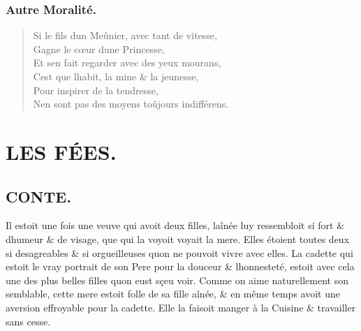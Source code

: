 \documentclass[14pt,a4paper]{memoir}
\newcommand{\notechapter}[1]{%
  \addtonotes{\protect\section*{#1}}%
}
\newcommand{\notesection}[1]{%
  \addtonotes{\protect\par\protect\vspace{2ex}\protect\noindent\textbf{#1}\protect\par\protect\vspace{1ex}}%
}
\begin{document}
{{\begin{otherlanguage}{french}
\begin{verse}
\end{verse}

\subsection{Autre Moralité.}

\begin{verse}
  \small
Si le fils d\textquotesingle un Meûnier, avec tant de vitesse,  \\
Gagne le cœur d\textquotesingle une Princesse, \\
Et s\textquotesingle en fait regarder avec des yeux mourans, \\
C\textquotesingle est que l\textquotesingle habit, la mine \& la jeunesse, \\
Pour inspirer de la tendresse, \\
N\textquotesingle en sont pas des moyens toûjours indifférens.

\end{verse}

\chapter{LES FÉES.}
\notechapter{LES FÉES.}

\section{CONTE.}
\notesection{CONTE.}

Il estoit une fois une veuve qui avoit deux filles,
l\textquotesingle aînée luy ressembloit si fort \&
d\textquotesingle humeur \& de visage, que qui la voyoit voyait la mere.
Elles étoient toutes deux si desagreables \& si orgueilleuses
qu\textquotesingle on ne pouvoit vivre avec elles. La cadette qui estoit
le vray portrait de son Pere pour la douceur \&
l\textquotesingle honnesteté, estoit avec cela une des plus belles
filles qu\textquotesingle on eust sçeu voir. Comme on aime naturellement
son semblable, cette mere estoit folle de sa fille aînée, \& en même
temps avoit une aversion effroyable pour la cadette. Elle la faisoit
manger à la Cuisine \& travailler sans cesse.


\end{otherlanguage}}}
\end{document}
